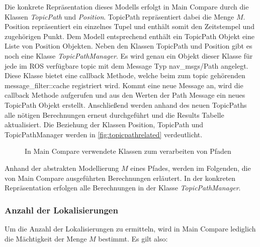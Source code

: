 Die konkrete Repräsentation dieses Modells erfolgt in Main Compare durch die
Klassen \textit{TopicPath} und \textit{Position}. TopicPath repräsentiert dabei
die Menge $M$. Position repräsentiert ein einzelnes Tupel und enthält somit den
Zeitstempel und zugehörigen Punkt. Dem Modell entsprechend enthält ein
TopicPath Objekt eine Liste von Position Objekten.  Neben den Klassen TopicPath
und Position gibt es noch eine Klasse \textit{TopicPathManager}. Es wird genau
ein Objekt dieser Klasse für jede im ROS verfügbare topic mit dem Message Typ
nav\_msgs/Path angelegt. Diese
Klasse bietet eine callback Methode, welche beim zum topic gehörenden
message\_filter::cache registriert wird. Kommt eine neue Message an, wird die
callback Methode aufgerufen und aus den Werten der Path Message ein neues
TopicPath Objekt erstellt. Anschließend werden anhand des neuen TopicPaths
alle nötigen Berechnungen erneut durchgeführt und die Results Tabelle
aktualisiert. Die Beziehung der Klassen Position, TopicPath und
TopicPathManager werden in \autoref{fig:topicpathrelated} verdeutlicht.

\begin{figure}[t]
  \begin{center}
  \end{center}
  \caption{In Main Compare verwendete Klassen zum verarbeiten von Pfaden}
  \label{fig:topicpathrelated}
\end{figure}

Anhand der abstrakten Modellierung $M$ eines Pfades, werden im Folgenden, die von
Main Compare ausgeführten Berechnungen erläutert. In der konkreten
Repräsentation erfolgen alle Berechnungen in der Klasse \textit{TopicPathManager}. 

\subsubsection{Anzahl der Lokalisierungen}
Um die Anzahl der Lokalisierungen zu ermitteln, wird in Main Compare lediglich die
Mächtigkeit der Menge $M$ bestimmt. Es gilt also:

